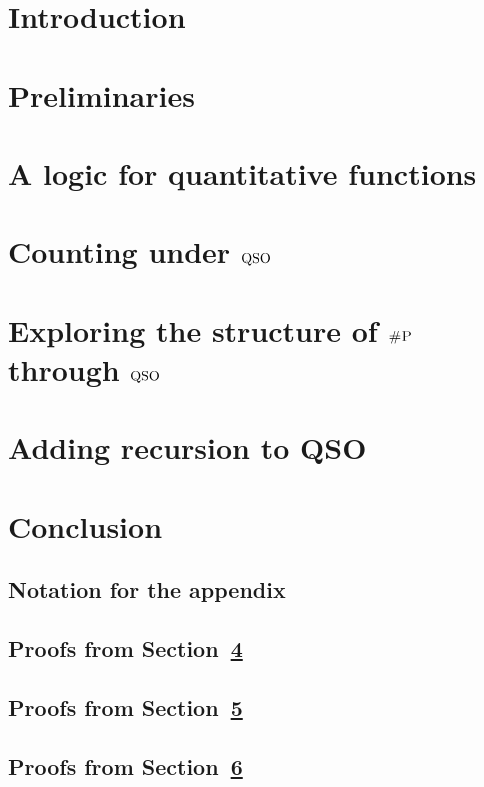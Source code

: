 \documentclass[conference]{IEEEtran}
\begin{document}
\IEEEpeerreviewmaketitle

\section{Introduction}


\section{Preliminaries} \label{sec:preliminaries}


\section{A logic for quantitative functions} \label{sec:logic}


\section{Counting under ${\rm QSO}$} \label{sec:complexity}


\section{Exploring the structure of $\text{\sc \#P}$ through ${\rm QSO}$} \label{sec:syntactic}


\section{Adding recursion to QSO}\label{sec:beyond}


\section{Conclusion}









\newpage

\onecolumn
\appendix

\subsection{Notation for the appendix}


\bigskip

\newpage
\subsection{Proofs from Section~\ref{sec:complexity}}


\newpage
\subsection{Proofs from Section~\ref{sec:syntactic}}


\newpage
\subsection{Proofs from Section~\ref{sec:beyond}}

\end{document}
